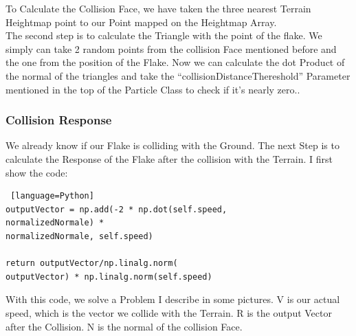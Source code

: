 \documentclass{sig-alternate-05-2015}
\begin{document}
To Calculate the Collision Face, we have taken the three nearest Terrain Heightmap point to our Point mapped on the Heightmap Array. \\
The second step is to calculate the Triangle with the point of the flake. We simply can take 2 random points from the collision Face mentioned before and the one from the position of the Flake. 
Now we can calculate the dot Product of the normal of the triangles and take the “collisionDistanceThereshold” Parameter mentioned in the top of the Particle Class to check if it’s nearly zero..\\

\subsubsection{Collision Response}
We already know if our Flake is colliding with the Ground. The next Step is to calculate the Response of the Flake after the collision with the Terrain. I first show the code: \\
\begin{lstlisting} [language=Python]
outputVector = np.add(-2 * np.dot(self.speed, 
normalizedNormale) * 
normalizedNormale, self.speed)

return outputVector/np.linalg.norm(
outputVector) * np.linalg.norm(self.speed)
\end{lstlisting}
With this code, we solve a Problem I describe in some pictures. 
V is our actual speed, which is the vector we collide with the Terrain. R is the output Vector after the Collision. N is the normal of the collision Face. 
\end{document}

